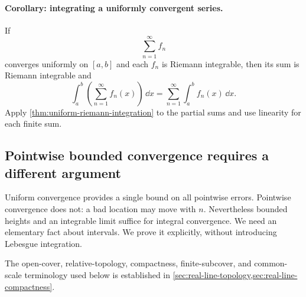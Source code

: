 \paragraph{Corollary: integrating a uniformly convergent series.}
If
\[
\sum_{n=1}^{\infty}f_n
\]
converges uniformly on $[a,b]$ and each $f_n$
is Riemann integrable, then its sum is Riemann integrable and
\[
\int_a^b\left(\sum_{n=1}^{\infty}f_n(x)\right)\,\dd x
=\sum_{n=1}^{\infty}\int_a^b f_n(x)\,\dd x.
\]
Apply \cref{thm:uniform-riemann-integration} to the partial sums and use
linearity for each finite sum.

\subsection{Pointwise bounded convergence requires a different argument}
\label{thm:dominated-uniform-riemann}
Uniform convergence provides a single bound on all pointwise errors.
Pointwise convergence does not: a bad location may move with $n$.
Nevertheless bounded heights and an integrable limit suffice for integral
convergence. We need an elementary fact about intervals.
We prove it explicitly, without introducing Lebesgue integration.

The open-cover, relative-topology, compactness, finite-subcover, and
common-scale terminology used below is established in
\cref{sec:real-line-topology,sec:real-line-compactness}.

